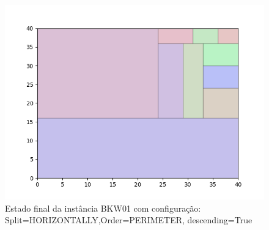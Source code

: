 \begin{figure}[H]
    \centering
    \caption[]{Estado final da instância BKW01 com configuração: Split=HORIZONTALLY,Order=PERIMETER, descending=True}
    \label{fig:bkw01-horizontally-perimeter-true}
    \includegraphics[scale=0.5]{output/figures/bkw/bkw01/horizontally/perimeter/true/00}
\end{figure}